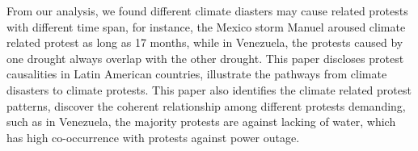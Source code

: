 \documentclass[9pt,twocolumn,twoside]{pnas-new}
\begin{document}
From our analysis, we found different climate diasters may cause related protests with different time span, for instance, the Mexico storm Manuel aroused climate related protest as long as 17 months, while in Venezuela, the protests caused by one drought always overlap with the other drought. This paper discloses protest causalities in Latin American countries, illustrate the pathways from climate disasters to climate protests. This paper also identifies the climate related protest patterns, discover the coherent relationship among different protests demanding, such as in Venezuela, the majority protests are against lacking of water, which has high co-occurrence with protests against power outage.
\end{document}

